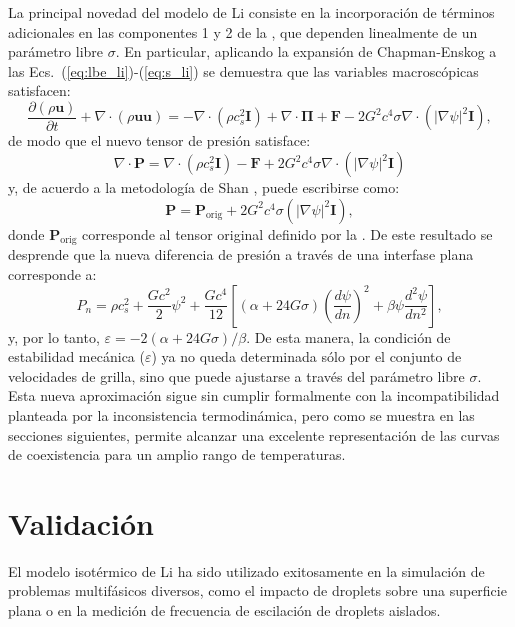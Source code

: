 La principal novedad del modelo de Li consiste en la incorporaci\'on de t\'erminos adicionales en las componentes 1 y 2 de la , que dependen linealmente de un par\'ametro libre $\sigma$. En particular, aplicando la expansi\'on de Chapman-Enskog a las Ecs.~(\ref{eq:lbe_li})-(\ref{eq:s_li}) se demuestra que las variables macrosc\'opicas satisfacen:
\begin{equation}
	\dfrac{\partial (\rho \bm{u})}{\partial t} + \nabla \cdot (\rho \bm{uu}) = -\nabla \cdot (\rho c_s^2 \bm{I}) + \nabla \cdot \bm{\Pi} + \bm{F} - 2G^2 c^4 \sigma \nabla \cdot (|\nabla \psi|^2 \bm{I}),
\end{equation}
de modo que el nuevo tensor de presi\'on satisface:
\begin{equation}
	\nabla \cdot \bm{P} = \nabla \cdot (\rho c_s^2 \bm{I}) - \bm{F} + 2G^2 c^4 \sigma \nabla \cdot (|\nabla \psi|^2 \bm{I})
\end{equation}
y, de acuerdo a la metodolog\'ia de Shan \cite{shan_pressure_2008}, puede escribirse como:
\begin{equation}
	\bm{P} = \bm{P}_{\mbox{orig}} + 2G^2 c^4 \sigma (|\nabla \psi|^2 \bm{I}),
\end{equation}
donde $\bm{P}_{\mbox{orig}}$ corresponde al tensor original definido por la . De este resultado se desprende que la nueva diferencia de presi\'on a trav\'es de una interfase plana corresponde a:
\begin{equation}
	P_n = \rho c_s^2 + \dfrac{G c^2}{2} \psi^2 + \dfrac{G c^4}{12} \left[ (\alpha+24G\sigma) \left( \dfrac{d\psi}{dn} \right)^2 + \beta \psi \dfrac{d^2 \psi}{dn^2} \right],
\end{equation}
y, por lo tanto, $\varepsilon=-2(\alpha + 24 G \sigma)/\beta$. De esta manera, la condici\'on de estabilidad mec\'anica ($\varepsilon$) ya no queda determinada s\'olo por el conjunto de velocidades de grilla, sino que puede ajustarse a trav\'es del par\'ametro libre $\sigma$. Esta nueva aproximaci\'on sigue sin cumplir formalmente con la incompatibilidad planteada por la inconsistencia termodin\'amica, pero como se muestra en las secciones siguientes, permite alcanzar una excelente representaci\'on de las curvas de coexistencia para un amplio rango de temperaturas.


\section{Validaci\'on}

El modelo isot\'ermico de Li ha sido utilizado exitosamente en la simulaci\'on de problemas multif\'asicos diversos, como el impacto de droplets sobre una superficie plana o en la medici\'on de frecuencia de escilaci\'on de droplets aislados. 

